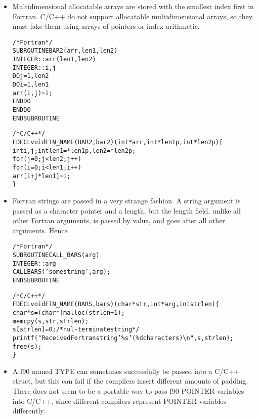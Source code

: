 \begin{itemize}
\item Multidimensional allocatable arrays are stored with
the smallest index first in Fortran.  C/C++ do not support
allocatable multidimensional arrays, so they must fake them
using arrays of pointers or index arithmetic.

\begin{alltt}
/* Fortran */
SUBROUTINE BAR2(arr,len1,len2) 
    INTEGER :: arr(len1,len2)
    INTEGER :: i,j
    DO j=1,len2
      DO i=1,len1
        arr(i,j)=i;
      END DO
    END DO
END SUBROUTINE

/* C/C++ */
FDECL void FTN\_NAME(BAR2,bar2)(int *arr,int *len1p,int *len2p) \{
    int i,j; int len1=*len1p, len2=*len2p;
    for (j=0;j<len2;j++)
    for (i=0;i<len1;i++)
        arr[i+j*len1]=i;
\}
\end{alltt}

\item Fortran strings are passed in a very strange fashion.
A string argument is passed as a character pointer and a 
length, but the length field, unlike all other Fortran arguments,
is passed by value, and goes after all other arguments.
Hence 

\begin{alltt}
/* Fortran */
SUBROUTINE CALL\_BARS(arg) 
    INTEGER :: arg
    CALL BARS('some string',arg);
END SUBROUTINE

/* C/C++ */
FDECL void FTN\_NAME(BARS,bars)(char *str,int *arg,int strlen) \{
    char *s=(char *)malloc(strlen+1);
    memcpy(s,str,strlen);
    s[strlen]=0; /* nul-terminate string */
    printf("Received Fortran string '\%s' (\%d characters){\textbackslash}n",s,strlen);
    free(s);
\}
\end{alltt}


\item A f90 named TYPE can sometimes successfully be passed into a 
C/C++ struct, but this can fail if the compilers insert different
amounts of padding.  There does not seem to be a portable way to 
pass f90 POINTER variables into C/C++, since different compilers
represent POINTER variables differently.  

\end{itemize}
